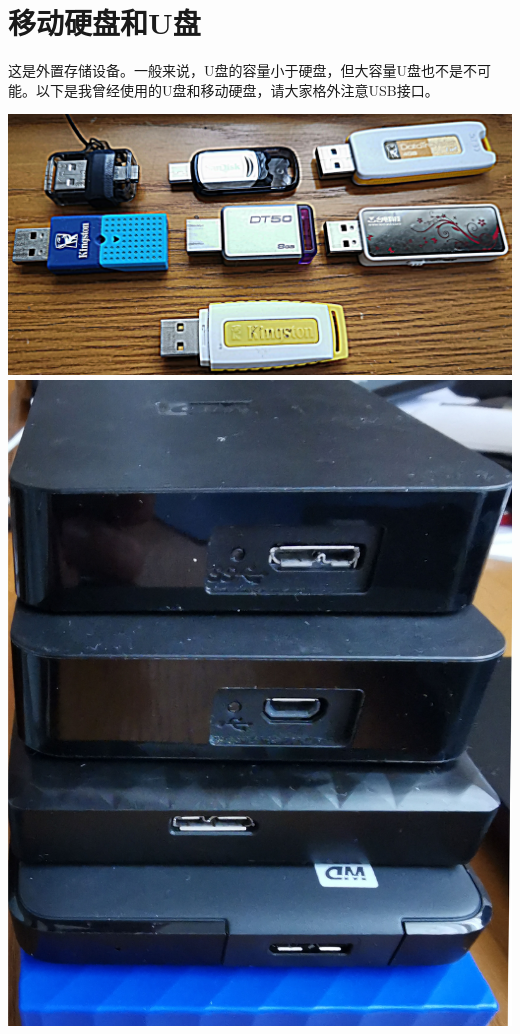 \section{移动硬盘和U盘}
这是外置存储设备。一般来说，U盘的容量小于硬盘，但大容量U盘也不是不可能。以下是我曾经使用的U盘和移动硬盘，请大家格外注意USB接口。
\begin{center}
	\includegraphics[scale=0.05]{pic/FlashDisk1}	\\\includegraphics[scale=0.05]{pic/FlashDisk2}
\end{center} \par
